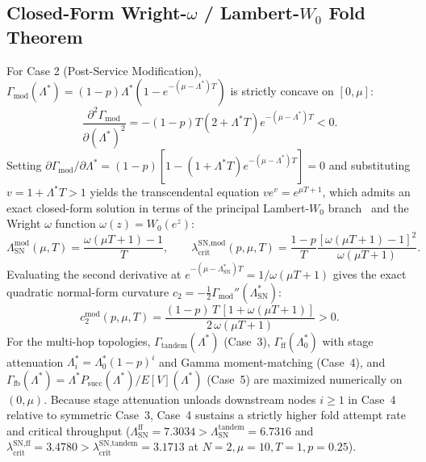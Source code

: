 \documentclass[12pt,onecolumn]{article}
\begin{document}
\subsection{Closed-Form Wright-\texorpdfstring{$\omega$}{omega} / Lambert-\texorpdfstring{$W_0$}{W0} Fold Theorem}
For Case 2 (Post-Service Modification), $\Gamma_{\text{mod}}(\Lambda^*) = (1 - p)\Lambda^*(1 - e^{-(\mu - \Lambda^*)T})$ is strictly concave on $[0, \mu]$:
\begin{equation}
\frac{\partial^2 \Gamma_{\text{mod}}}{\partial (\Lambda^*)^2} = -(1 - p)T(2 + \Lambda^* T)e^{-(\mu - \Lambda^*)T} < 0.
\end{equation}
Setting $\partial \Gamma_{\text{mod}}/\partial \Lambda^* = (1 - p)[1 - (1 + \Lambda^* T)e^{-(\mu - \Lambda^*)T}] = 0$ and substituting $v = 1 + \Lambda^* T > 1$ yields the transcendental equation $v e^v = e^{\mu T + 1}$, which admits an exact closed-form solution in terms of the principal Lambert-$W_0$ branch~\cite{corless1996lambertw} and the Wright $\omega$ function $\omega(z) = W_0(e^z)$:
\begin{equation}
\Lambda_{\text{SN}}^{\text{mod}}(\mu, T) = \frac{\omega(\mu T + 1) - 1}{T}, \qquad
\lambda_{\text{crit}}^{\text{SN,mod}}(p, \mu, T) = \frac{1 - p}{T}\frac{[\omega(\mu T + 1) - 1]^2}{\omega(\mu T + 1)}.
\label{eq:wright_omega_sn}
\end{equation}
Evaluating the second derivative at $e^{-(\mu - \Lambda_{\text{SN}}^*)T} = 1/\omega(\mu T + 1)$ gives the exact quadratic normal-form curvature $c_2 = -\frac{1}{2}\Gamma_{\text{mod}}''(\Lambda_{\text{SN}}^*)$:
\begin{equation}
c_2^{\text{mod}}(p, \mu, T) = \frac{(1 - p)\,T\,[1 + \omega(\mu T + 1)]}{2\,\omega(\mu T + 1)} > 0.
\label{eq:normal_form_c2}
\end{equation}
For the multi-hop topologies, $\Gamma_{\text{tandem}}(\Lambda^*)$ (Case~3), $\Gamma_{\text{ff}}(\Lambda_0^*)$ with stage attenuation $\Lambda_i^* = \Lambda_0^*(1-p)^i$ and Gamma moment-matching (Case~4), and $\Gamma_{\text{fb}}(\Lambda^*) = \Lambda^* P_{\text{succ}}(\Lambda^*)/E[V](\Lambda^*)$ (Case~5) are maximized numerically on $(0, \mu)$. Because stage attenuation unloads downstream nodes $i \ge 1$ in Case~4 relative to symmetric Case~3, Case~4 sustains a strictly higher fold attempt rate and critical throughput ($\Lambda_{\text{SN}}^{\text{ff}} = 7.3034 > \Lambda_{\text{SN}}^{\text{tandem}} = 6.7316$ and $\lambda_{\text{crit}}^{\text{SN,ff}} = 3.4780 > \lambda_{\text{crit}}^{\text{SN,tandem}} = 3.1713$ at $N=2, \mu=10, T=1, p=0.25$).
\end{document}
